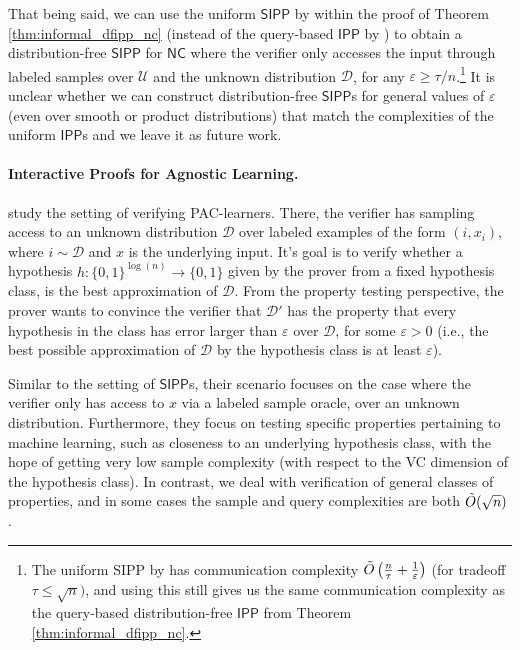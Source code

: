 \documentclass[11pt]{article}
\newcommand{\NC}{\mathsf{NC}}
\newcommand{\IPP}{\mathsf{IPP}}
\newcommand{\sU}{\mathcal{U}}
\newcommand{\sD}{\mathcal{D}}
\newcommand{\eps}{\varepsilon}
\begin{document}
That being said, we can use the uniform $\mathsf{SIPP}$ by \cite{GR22_sample} within the proof of Theorem \ref{thm:informal_dfipp_nc} (instead of the query-based $\IPP$ by \cite{RR20_batch_polylog}) to obtain a distribution-free $\mathsf{SIPP}$ for $\NC$ where the verifier only accesses the input through labeled samples over $\sU$ and the unknown distribution $\sD$, for any $\varepsilon \geq \tau/n$.\footnote{The uniform \textsf{SIPP} by \cite{GR22_sample} has communication complexity $\Tilde{O}\left(\frac{n}{\tau} + \frac{1}{\eps} \right)$ (for tradeoff  $\tau \leq \sqrt{n})$, and using this still gives us the same communication complexity as the query-based distribution-free $\IPP$ from Theorem \ref{thm:informal_dfipp_nc}.} It is unclear whether we can construct distribution-free $\mathsf{SIPP}$s for general values of $\varepsilon$ (even over smooth or product distributions) that match the complexities of the uniform $\IPP$s and we leave it as future work.

\paragraph{Interactive Proofs for Agnostic Learning.} \cite{GRSY21} study the setting of verifying PAC-learners. There, the verifier has sampling access to an unknown distribution $\sD$ over labeled examples of the form $(i,x_i)$, where $i \sim \sD$ and $x$ is the underlying input. It's goal is to verify whether a hypothesis $h : \{0,1\}^{\log(n)} \rightarrow \{0,1\}$ given by the prover from a fixed hypothesis class, is the best approximation of $\sD$. From the property testing perspective, the prover wants to convince the verifier that $\sD'$ has the property that every hypothesis in the class has error larger than $\varepsilon$ over $\sD$, for some $\varepsilon > 0$ (i.e., the best possible approximation of $\sD$ by the hypothesis class is at least $\varepsilon$).

Similar to the setting of $\mathsf{SIPP}$s, their scenario focuses on the case where the verifier only has access to $x$ via a labeled sample oracle, over an unknown distribution. Furthermore, they focus on testing specific properties pertaining to machine learning, such as closeness to an underlying hypothesis class, with the hope of getting very low sample complexity (with respect to the VC dimension of the hypothesis class). In contrast, we deal with verification of general classes of properties, and in some cases the sample and query complexities are both $\Tilde{O}(\sqrt{n})$.
\end{document}
